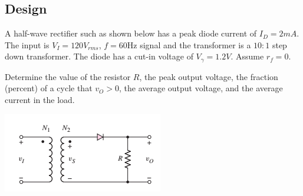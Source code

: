 \documentclass[12pt,letterpaper,titlepage]{article}
\begin{document}
\begin{raggedright}
\subsection{Design}

A half-wave rectifier such as shown below has a peak diode current of $I_D = 2mA$.
The input is $V_I=120 V_{rms}$, $f=60 \text{Hz}$ signal and 
the transformer is a $10:1$ step down transformer.
The diode has a cut-in voltage of $V_\gamma = 1.2 V$.
Assume $r_f = 0$.

Determine the value of the resistor $R$,
 the peak output voltage,
 the fraction (percent) of a cycle that $v_O > 0$,
 the average output voltage, and
 the average current in the load.

\begin{center}
\includegraphics[width=\textwidth, height=7\baselineskip, keepaspectratio=true]{ds2}
\end{center}


\end{raggedright}
\end{document}
